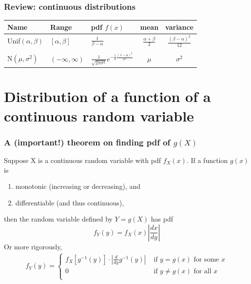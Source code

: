 \documentclass[slidestop,compress,mathserif]{beamer}
\begin{document}
\begin{frame}\frametitle{Review: continuous distributions}

\begin{center}
\begin{tabular}{lllcc}
\hline
			Name 					& Range 			& pdf $f(x)$																& mean 						& variance \\
\hline
Unif$(\alpha, \beta)$		& $[\alpha, \beta]$	& $\frac{1}{\beta - \alpha}$											& $\frac{\alpha + \beta}{2}$	& $\frac{(\beta - \alpha)^2}{12}$\\
&&&&\\
N$(\mu, \sigma^2)$		& $(-\infty, \infty)$	& $\frac{1}{\sqrt{2\pi\sigma^2}}e^{ -\frac{1}{2}\frac{(x-\mu)^2}{\sigma^2}}$	& $\mu$						& $\sigma^2$\\ 
\hline
\end{tabular}
\end{center}

\end{frame}


\section{Distribution of a function of a continuous random variable}

\begin{frame}
\frametitle{A (important!) theorem on finding pdf of $g(X)$}
Suppose X is a continuous random variable with pdf $f_X(x)$. If a function $g(x)$ is
\begin{enumerate}
\item monotonic (increasing or decreasing), and
\item differentiable (and thus continuous),
\end{enumerate}
\pause
then the random variable defined by $Y = g(X)$ has pdf
\[ f_Y ( y ) = f_X( x )  \left|\frac{dx}{dy}\right| \]
\pause
Or more rigorously,
\begin{align*}
f_Y ( y ) =
  \begin{cases}
  f_X\left[ g^{-1}(y) \right] \cdot \left|\frac{d}{dy}g^{-1}(y)\right| & \text{ if } y = g(x) \text{ for some } x \\
  0 													 & \text{ if } y \neq g(x) \text{ for all } x \\
  \end{cases}
\end{align*}

\end{frame}
\end{document}
